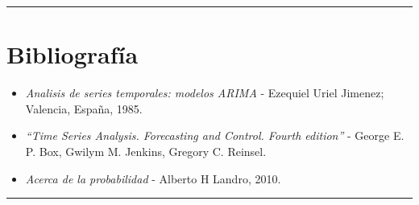 \documentclass[]{article}
\providecommand{\tightlist}{%
  \setlength{\itemsep}{0pt}\setlength{\parskip}{0pt}}
\begin{document}
\begin{center}\rule{0.5\linewidth}{\linethickness}\end{center}

\hypertarget{bibliografia}{%
\section{Bibliografía}\label{bibliografia}}

\begin{itemize}
\tightlist
\item
  \emph{Analisis de series temporales: modelos ARIMA} - Ezequiel Uriel
  Jimenez; Valencia, España, 1985.
\item
  \emph{``Time Series Analysis. Forecasting and Control. Fourth
  edition''} - George E. P. Box, Gwilym M. Jenkins, Gregory C. Reinsel.
\item
  \emph{Acerca de la probabilidad} - Alberto H Landro, 2010.
\end{itemize}

\begin{center}\rule{0.5\linewidth}{\linethickness}\end{center}
\end{document}
